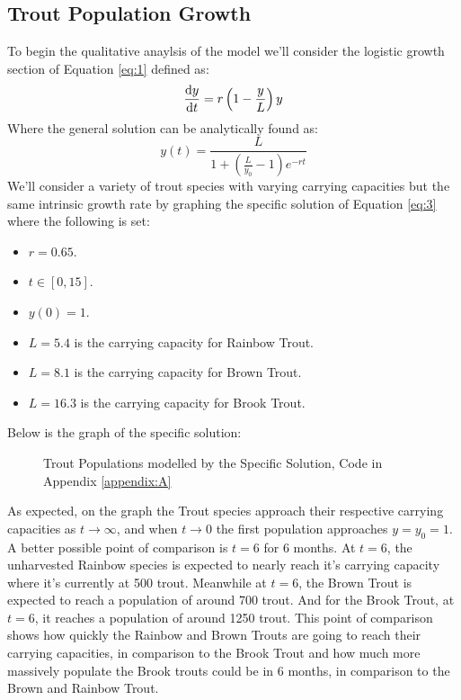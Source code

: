 \documentclass[letterpaper,12pt]{article}
\begin{document}
\subsection{Trout Population Growth}
To begin the qualitative anaylsis of the model we'll consider the logistic growth section of Equation \eqref{eq:1} defined as:
\begin{equation*}
    \dv{y}{t} = r\left(1 - \frac{y}{L}\right)y
\end{equation*}
Where the general solution can be analytically found as:
\begin{equation} \label{eq:3}
    y(t) = \frac{L}{1 + \left(\frac{L}{y_0} - 1\right)e^{-rt}}
\end{equation}
We'll consider a variety of trout species with varying carrying capacities but the same intrinsic growth rate by graphing the specific solution of Equation \eqref{eq:3} where the following is set:
\begin{itemize}
    \item \(r = 0.65\).
    \item \(t \in [0,15]\).
    \item \(y(0) = 1\).
    \item \(L = 5.4\) is the carrying capacity for Rainbow Trout.
    \item \(L = 8.1\) is the carrying capacity for Brown Trout.
    \item \(L = 16.3\) is the carrying capacity for Brook Trout.
\end{itemize}
Below is the graph of the specific solution:
\newline
\begin{figure}[H]
    \centering
    
    \caption{Trout Populations modelled by the Specific Solution, Code in Appendix \ref{appendix:A}}
    \label{fig:1}
\end{figure}
\noindent As expected, on the graph the Trout species approach their respective carrying capacities as \(t \to \infty\), and when \(t \to 0\) the first population approaches \(y = y_0 = 1\).
A better possible point of comparison is \(t = 6\) for 6 months.
At \(t = 6\), the unharvested Rainbow species is expected to nearly reach it's carrying capacity where it's currently at 500 trout.
Meanwhile at \(t = 6\), the Brown Trout is expected to reach a population of around 700 trout.
And for the Brook Trout, at \(t = 6\), it reaches a population of around 1250 trout.
This point of comparison shows how quickly the Rainbow and Brown Trouts are going to reach their carrying capacities, in comparison to the Brook Trout and how much more massively populate the Brook trouts could be in 6 months, in comparison to the Brown and Rainbow Trout.
\end{document}
